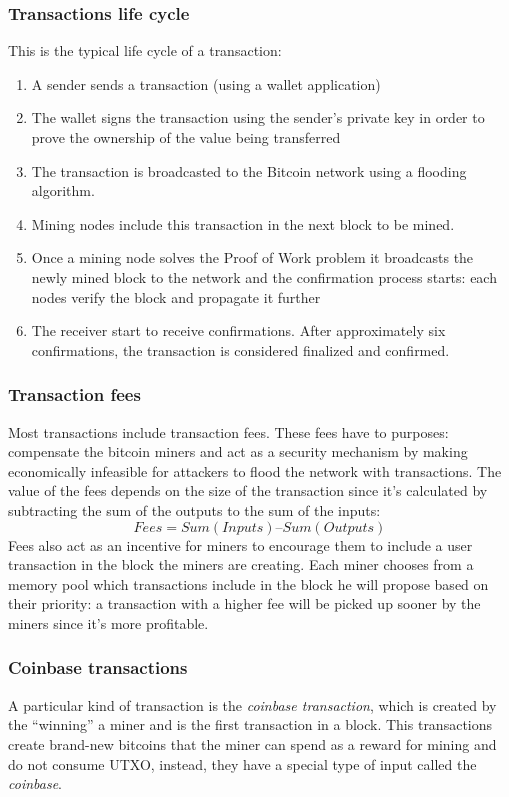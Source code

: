 \subsubsection{Transactions life cycle}
This is the typical life cycle of a transaction:
\begin{enumerate}
  \item A sender sends a transaction (using a wallet application)
  \item The wallet signs the transaction using the sender's private key in order
  to prove the ownership of the value being transferred
  \item The transaction is broadcasted to the Bitcoin network using a flooding algorithm.
  \item Mining nodes include this transaction in the next block to be mined.
  \item Once a mining node solves the Proof of Work problem it broadcasts the
  newly mined block to the network and the confirmation process starts: each
  nodes verify the block and propagate it further
  \item The receiver start to receive confirmations. After approximately six
  confirmations, the transaction is considered finalized and confirmed.
\end{enumerate}




\subsubsection{Transaction fees} Most transactions include transaction fees.
These fees have to purposes: compensate the bitcoin miners and act as a security
mechanism by making economically infeasible for attackers to flood the network
with transactions. The value of the fees depends on the size of the
transaction since it's calculated by subtracting the sum of the outputs to the
sum of the inputs: \[Fees = Sum(Inputs) – Sum(Outputs)\] Fees also  act as an
incentive for miners to encourage them to include a user transaction in the
block the miners are creating. Each miner chooses from a memory pool which
transactions include in the block he will propose based on their priority:  a
transaction with a higher fee will be picked up sooner by the miners since it's
more profitable.


\subsubsection{Coinbase transactions} A particular kind of transaction is the
\emph{coinbase transaction}, which is created by the ``winning'' a miner and is
the first transaction in a block. This transactions create brand-new bitcoins
that the miner can spend as a reward for mining and do not consume UTXO,
instead, they have a special type of input called the \emph{coinbase}.








